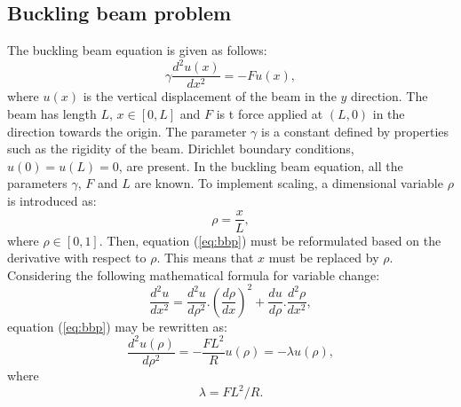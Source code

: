 \documentclass[12pt, a4paper, reqno, article]{amsart}
\begin{document}
\subsection{Buckling beam problem}
The buckling beam equation is given as follows:
\begin{equation}
\gamma\frac{d^2u(x)}{dx^2}=-Fu(x),
\label{eq:bbp}
\end{equation}
where $u(x)$ is the vertical displacement of the beam in the $y$ direction. The beam has length $L$, $x\in [0,L]$ and $F$ is t force applied at $(L,0)$ in the direction towards the origin. The parameter $\gamma$ is a constant defined by properties such as the rigidity of the beam. Dirichlet boundary conditions, $u(0)=u(L)=0$, are present. In the buckling beam equation, all the parameters $\gamma$, $F$ and $L$ are known. To implement scaling, a dimensional variable $\rho$ is introduced as:
\[
 \rho = \frac{x}{L},
\]
where $\rho \in [0,1]$. Then, equation (\ref{eq:bbp}) must be reformulated based on the derivative with respect to $\rho$. This means that $x$ must be replaced by $\rho$. Considering the following mathematical formula for variable change:
\[
 \frac{d^2 u}{d x^2} = \frac{d^2 u}{d \rho^2}.(\frac{d \rho}{d x})^2 + \frac{d u}{d \rho}.\frac{d^2 \rho}{d x^2},
\]
equation (\ref{eq:bbp}) may be rewritten as:
\begin{equation}
\frac{d^2 u(\rho)}{d\rho^2} = -\frac{FL^2}{R} u(\rho)=-\lambda u(\rho),
\label{eq:bbp2}
\end{equation}
where
\[
\lambda = FL^2/R.
\]\\
\end{document}
